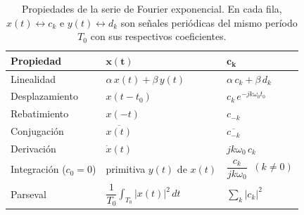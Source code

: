 \documentclass[class=book, crop=false]{standalone}
\begin{document}
\begin{table}[H]
    \centering
    \begin{tabular}{lll}
        \toprule
        \textbf{Propiedad} & $\boldsymbol{x(t)}$ & $\boldsymbol{c_k}$ \\
        \midrule
        Linealidad        & $\alpha\,x(t) + \beta\,y(t)$
                          & $\alpha\,c_k + \beta\,d_k$ \\[4pt]
        Desplazamiento    & $x(t - t_0)$
                          & $c_k\,e^{-jk\omega_0 t_0}$ \\[4pt]
        Rebatimiento      & $x(-t)$
                          & $c_{-k}$ \\[4pt]
        Conjugación       & $\overline{x(t)}$
                          & $\overline{c_{-k}}$ \\[4pt]
        Derivación        & $\dot{x}(t)$
                          & $jk\omega_0\,c_k$ \\[4pt]
        Integración \scriptsize{($c_0=0$)}
                          & primitiva $y(t)$ de $x(t)$
                          & $\dfrac{c_k}{jk\omega_0}\;\;(k\neq 0)$ \\[8pt]
        Parseval          & $\dfrac{1}{T_0}\displaystyle\int_{T_0}|x(t)|^2\,dt$
                          & $\displaystyle\sum_{k}|c_k|^2$ \\
        \bottomrule
    \end{tabular}
    \caption{Propiedades de la serie de Fourier exponencial. En cada
             fila, $x(t)\leftrightarrow c_k$ e $y(t)\leftrightarrow d_k$
             son señales periódicas del mismo período $T_0$ con sus
             respectivos coeficientes.}
    \label{tab:propiedades_sf}
\end{table}
\end{document}
